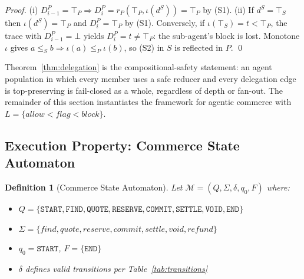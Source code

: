 \documentclass{article}
\newtheorem{definition}{Definition}
\begin{document}
\begin{proof}
(i) $D^P_{i-1}=\top_P\Rightarrow D^P_i=r_P(\top_P,\iota(d^S))=\top_P$ by (S1).
(ii) If $d^S=\top_S$ then $\iota(d^S)=\top_P$ and $D^P_i=\top_P$ by (S1).
Conversely, if $\iota(\top_S)=t<\top_P$, the trace with $D^P_{i-1}=\bot$ yields
$D^P_i=t\ne\top_P$: the sub-agent's block is lost. Monotone $\iota$ gives
$a\le_S b\Rightarrow\iota(a)\le_P\iota(b)$, so (S2) in $S$ is reflected in $P$. \qed
\end{proof}

Theorem~\ref{thm:delegation} is the compositional-safety statement: an agent
population in which every member uses a safe reducer and every delegation edge is
top-preserving is fail-closed as a whole, regardless of depth or fan-out. The
remainder of this section instantiates the framework for agentic commerce with
$L=\{\textit{allow}<\textit{flag}<\textit{block}\}$.

\subsection{Execution Property: Commerce State Automaton}
\label{sec:automaton}

\begin{definition}[Commerce State Automaton]
Let $\mathcal{M} = (Q, \Sigma, \delta, q_0, F)$ where:
\begin{itemize}
\item $Q = \{\texttt{START}, \texttt{FIND}, \texttt{QUOTE}, \texttt{RESERVE}, \texttt{COMMIT}, \texttt{SETTLE}, \texttt{VOID}, \texttt{END}\}$
\item $\Sigma = \{\textit{find}, \textit{quote}, \textit{reserve}, \textit{commit}, \textit{settle}, \textit{void}, \textit{refund}\}$
\item $q_0 = \texttt{START}$, $F = \{\texttt{END}\}$
\item $\delta$ defines valid transitions per Table~\ref{tab:transitions}
\end{itemize}
\end{definition}
\end{document}
